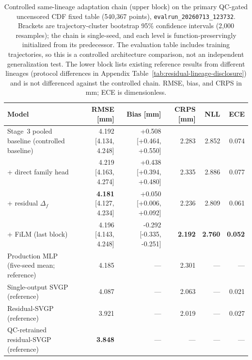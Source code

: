 \begin{table}[!ht]
\centering
\scriptsize
\setlength{\tabcolsep}{3pt}
\begin{tabular}{@{}lrrrrr@{}}
\toprule
Model & RMSE [mm] & Bias [mm] & CRPS [mm] & NLL & ECE \\
\midrule
Stage~3 pooled baseline (controlled baseline) & 4.192 [4.134, 4.248] & +0.508 [+0.464, +0.550] & 2.283 & 2.852 & 0.074 \\
\quad + direct family head & 4.219 [4.163, 4.274] & +0.438 [+0.394, +0.480] & 2.335 & 2.886 & 0.077 \\
\quad + residual \(\Delta_f\) & \textbf{4.181} [4.127, 4.234] & +0.050 [+0.006, +0.092] & 2.236 & 2.809 & 0.061 \\
\quad + FiLM (last block) & 4.196 [4.143, 4.248] & -0.292 [-0.335, -0.251] & \textbf{2.192} & \textbf{2.760} & \textbf{0.052} \\
\midrule
Production MLP (five-seed mean; reference) & 4.185 & --- & 2.301 & --- & --- \\
Single-output SVGP (reference) & 4.087 & --- & 2.063 & --- & 0.021 \\
Residual-SVGP (reference) & 3.921 & --- & 2.019 & --- & 0.027 \\
QC-retrained residual-SVGP (reference) & \textbf{3.848} & --- & --- & --- & --- \\
\bottomrule
\end{tabular}
\caption{Controlled same-lineage adaptation chain (upper block) on the primary QC-gated uncensored CDF fixed table (540{,}367 points), \texttt{evalrun\_\allowbreak{}20260713\_\allowbreak{}123732}. Brackets are trajectory-cluster bootstrap 95\% confidence intervals (2{,}000 resamples); the chain is single-seed, and each level is function-preservingly initialized from its predecessor. The evaluation table includes training trajectories, so this is a controlled architecture comparison, not an independent generalization test. The lower block lists existing reference results from different lineages (protocol differences in Appendix Table~\ref{tab:residual-lineage-disclosure}) and is not differenced against the controlled chain. RMSE, bias, and CRPS in mm; ECE is dimensionless.}
\label{tab:posthoc-residual-rewrite}
\end{table}

